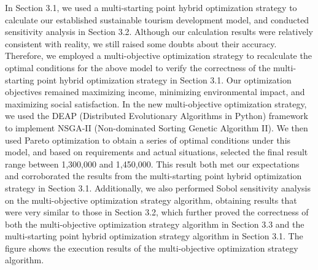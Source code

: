 \documentclass[12pt]{article}  %
\begin{document}
In Section 3.1, we used a multi-starting point hybrid optimization strategy to calculate our established sustainable tourism development model, and conducted sensitivity analysis in Section 3.2. Although our calculation results were relatively consistent with reality, we still raised some doubts about their accuracy. Therefore, we employed a multi-objective optimization strategy to recalculate the optimal conditions for the above model to verify the correctness of the multi-starting point hybrid optimization strategy in Section 3.1. Our optimization objectives remained maximizing income, minimizing environmental impact, and maximizing social satisfaction. In the new multi-objective optimization strategy, we used the DEAP (Distributed Evolutionary Algorithms in Python) framework to implement NSGA-II (Non-dominated Sorting Genetic Algorithm II). We then used Pareto optimization to obtain a series of optimal conditions under this model, and based on requirements and actual situations, selected the final result range between 1,300,000 and 1,450,000. This result both met our expectations and corroborated the results from the multi-starting point hybrid optimization strategy in Section 3.1. Additionally, we also performed Sobol sensitivity analysis on the multi-objective optimization strategy algorithm, obtaining results that were very similar to those in Section 3.2, which further proved the correctness of both the multi-objective optimization strategy algorithm in Section 3.3 and the multi-starting point hybrid optimization strategy algorithm in Section 3.1. The figure shows the execution results of the multi-objective optimization strategy algorithm.
\end{document}
